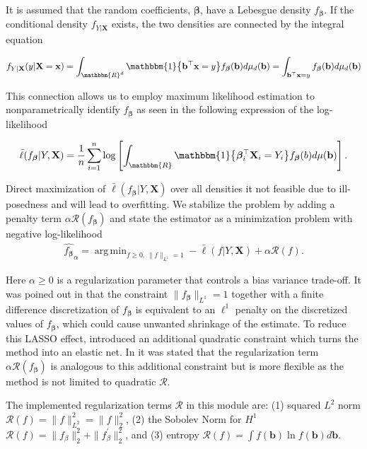 \documentclass[a4paper,12pt]{article}
\DeclareMathOperator*{\argmin}{arg\,min}
\newcommand{\bbeta}{{\boldsymbol{\beta}}}
\newcommand{\bX}{\mathbf{X}}
\newcommand{\bx}{\mathbf{x}}
\newcommand{\bb}{\mathbf{b}}
\newcommand{\calR}{\mathcal{R}}
\newcommand{\R}{\mathbbm{R}}
\begin{document}
It is assumed that the random coefficients, $\bbeta$, have a Lebesgue density $f_\bbeta$. If the conditional density $f_{Y|\bX}$ exists, the two densities are connected by the integral equation

\begin{align*}
	f_{Y|\bX}(y|\bX=\bx)=\int_{\R^{d}}\mathbbm{1}\big\{\bb^\top \bx=y\big\}f_\bbeta(\bb)d\mu_d(\bb) = \int_{\bb^\top \bx=y}f_\bbeta(\bb)d\mu_d(\bb)
	\label{eqn:line_int_f_beta}
\end{align*}

This connection allows us to employ maximum likelihood estimation to nonparametrically identify $f_\bbeta$ as seen in the following expression of the log-likelihood

\begin{equation*}
	\bar{\ell}(f_\bbeta|Y,\bX)=\frac{1}{n}\sum_{i=1}^{n}\log\left[\int_{\mathbbm{R}}\mathbbm{1}\big\{\bbeta_i^\top \bX_i=Y_i\big\}f_\bbeta(b)d\mu(\bb)\right].
	\label{eqn:avg_lhood}
\end{equation*}

Direct maximization of $\bar\ell(f_\bbeta|Y,\bX)$ over all densities it not feasible due to ill-posedness and will lead to overfitting. We stabilize the problem by adding a penalty term $\alpha \calR(f_\bbeta)$ and state the estimator as a minimization problem with negative log-likelihood
\begin{align}\label{eqn:method}
	\hat {f_\bbeta}_\alpha = \argmin_{f\ge 0,\, \|f\|_{L^1}=1} -\bar\ell(f|Y,\bX)+\alpha \calR(f).
\end{align}

Here $\alpha \ge 0$ is a regularization parameter that controls a bias variance trade-off. It was poined out in \cite{heiss2021nonparametric} that the constraint $\|f_\bbeta\|_{L^1}=1$ together with a finite difference discretization of $f_\bbeta$ is equivalent to an $\ell^1$ penalty on the discretized values of $f_\bbeta$, which could cause unwanted shrinkage of the estimate. To reduce this LASSO effect, \cite{heiss2021nonparametric} introduced an additional quadratic constraint which turns the method into an elastic net. In \cite{dunker2021regularized} it was stated that the regularization term $\alpha\calR(f_\bbeta)$ is analogous to this additional constraint but is more flexible as the method is not limited to quadratic $\calR$.

The implemented regularization terms $\calR$ in this module are: (1) squared $L^2$ norm $\calR(f) = \|f\|_{L^2}^2 = \|f\|_{2}^2$, (2) the Sobolev Norm for $H^{1}$ $ \calR(f) =  \|f_\beta\|_{2}^{2}+\|f^{\prime}_\beta\|_{2}^{2}$, and (3) entropy $\calR(f) = \int{f(\bb)\ln{f(\bb)}d\bb}$.
	
\end{document}
